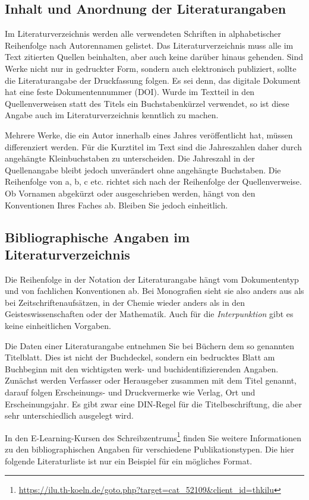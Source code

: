 \subsection{Inhalt und Anordnung der Literaturangaben}
\label{sec:bib-content}
Im Literaturverzeichnis werden alle verwendeten Schriften in alphabetischer Reihenfolge nach Autorennamen gelistet. Das Literaturverzeichnis muss alle im Text zitierten Quellen beinhalten, aber auch keine darüber hinaus gehenden. Sind Werke nicht nur in gedruckter Form, sondern auch elektronisch publiziert, sollte die Literaturangabe der Druckfassung folgen. Es sei denn, das digitale Dokument hat eine feste Dokumentennummer (DOI). Wurde im Textteil in den Quellenverweisen statt des Titels ein Buchstabenkürzel verwendet, so ist diese Angabe auch im Literaturverzeichnis kenntlich zu machen.
\par
Mehrere Werke, die ein Autor innerhalb eines Jahres veröffentlicht hat, müssen differenziert werden. Für die Kurztitel im Text sind die Jahreszahlen daher durch angehängte Kleinbuchstaben zu unterscheiden. Die Jahreszahl in der Quellenangabe bleibt jedoch unverändert ohne angehängte Buchstaben. Die Reihenfolge von a, b, c etc. richtet sich nach der Reihenfolge der Quellenverweise. Ob Vornamen abgekürzt oder ausgeschrieben werden, hängt von den Konventionen Ihres Faches ab. Bleiben Sie jedoch einheitlich.
%
\subsection{Bibliographische Angaben im Literaturverzeichnis}
Die Reihenfolge in der Notation der Literaturangabe hängt vom Dokumententyp und von fachlichen Konventionen ab. Bei Monografien sieht sie also anders aus als bei Zeitschriftenaufsätzen, in der Chemie wieder anders als in den Geisteswissenschaften oder der Mathematik. Auch für die \emph{Interpunktion} gibt es keine einheitlichen Vorgaben.
\par
Die Daten einer Literaturangabe entnehmen Sie bei Büchern dem so genannten Titelblatt. Dies ist nicht der Buchdeckel, sondern ein bedrucktes Blatt am Buchbeginn mit den wichtigsten werk- und buchidentifizierenden Angaben. Zunächst werden Verfasser oder Herausgeber zusammen mit dem Titel genannt, darauf folgen Erscheinungs- und Druckvermerke wie Verlag, Ort und Erscheinungsjahr. Es gibt zwar eine DIN-Regel für die Titelbeschriftung, die aber sehr unterschiedlich ausgelegt wird.
\par
In den E-Learning-Kursen des Schreibzentrums\footnote{\href{https://ilu.th-koeln.de/goto.php?target=cat\_52109\&client\_id=thkilu}{https://ilu.th-koeln.de/goto.php?target=cat\_52109\&client\_id=thkilu}} finden Sie weitere Informationen zu den bibliographischen Angaben für verschiedene Publikationstypen. Die hier folgende Literaturliste ist nur ein Beispiel für ein mögliches Format.

